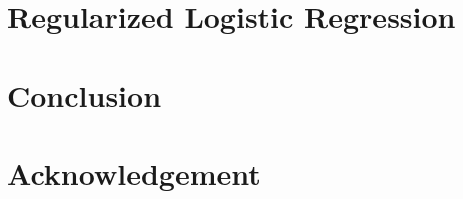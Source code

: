 \documentclass[conference]{IEEEtran}
\begin{document}
\section{Regularized Logistic Regression}

\section{Conclusion}



\section*{Acknowledgement}











\end{document}

